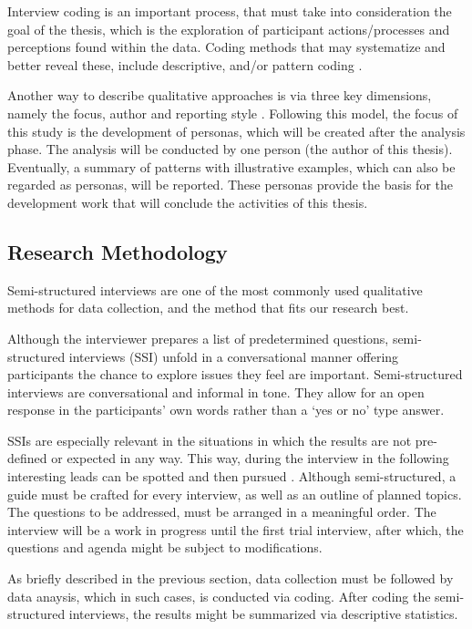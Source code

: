 \documentclass[a4paper]{article}
\begin{document}
Interview coding is an important process, that must take into consideration the goal of the thesis, which is the exploration of participant actions/processes and perceptions found within the data. Coding methods that may systematize and better reveal these, include descriptive, and/or pattern coding \cite{Wicks2017}.

Another way to describe qualitative approaches is via three key dimensions, namely the focus, author and reporting style \cite{Goodrick2015}. Following this model, the focus of this study is the development of personas, which will be created after the analysis phase. The analysis will be conducted by one person (the author of this thesis). Eventually, a summary of patterns with illustrative examples, which can also be regarded as personas, will be reported. These personas provide the basis for the development work that will conclude the activities of this thesis. 

\subsection{Research Methodology}

Semi-structured interviews are one of the most commonly used qualitative methods for data collection, and the method that fits our research best.

Although the interviewer prepares a list of predetermined questions, semi-structured interviews (SSI) unfold in a conversational manner offering participants the chance to explore issues
they feel are important. Semi-structured interviews are conversational and informal in tone. They allow for an open response in the participants’ own words rather than a ‘yes or no’ type answer. 

SSIs are especially relevant in the situations in which the results are not pre-defined or expected in any way. This way, during the interview in the following interesting leads can be spotted and then pursued \cite{Adams2015}. Although semi-structured, a guide must be crafted for every interview, as well as an outline of planned topics. The questions to be addressed, must be arranged in a meaningful order. The interview will be a work in progress until the first trial interview, after which, the questions and agenda might be subject to modifications.

As briefly described in the previous section, data collection must be followed by data anaysis, which in such cases, is conducted via coding. After coding the semi-structured interviews, the results might be summarized via descriptive statistics.
\end{document}
